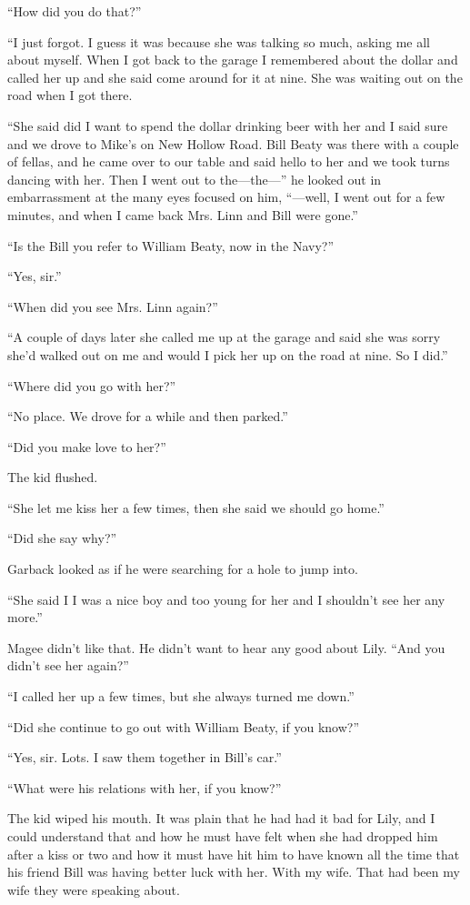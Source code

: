 \documentclass{novel}
\begin{document}
“How did you do that?”

“I just forgot. I guess it was because she was talking so much, asking me all about myself. When I got back to the garage I remembered about the dollar and called her up and she said come around for it at nine. She was waiting out on the road when I got there. 

“She said did I want to spend the dollar drinking beer with her and I said sure and we drove to Mike’s on New Hollow Road. Bill Beaty was there with a couple of fellas, and he came over to our table and said hello to her and we took turns dancing with her. Then I went out to the—the—” he looked out in embarrassment at the many eyes focused on him, “—well, I went out for a few minutes, and when I came back Mrs. Linn and Bill were gone.”

“Is the Bill you refer to William Beaty, now in the Navy?”

“Yes, sir.”

“When did you see Mrs. Linn again?”

“A couple of days later she called me up at the garage and said she was sorry she’d walked out on me and would I pick her up on the road at nine. So I did.”

“Where did you go with her?”

“No place. We drove for a while and then parked.”

“Did you make love to her?”

The kid flushed.

“She let me kiss her a few times, then she said we should go home.”

“Did she say why?”

Garback looked as if he were searching for a hole to jump into. 

“She said I I was a nice boy and too young for her and I shouldn’t see her any more.”

Magee didn’t like that. He didn’t want to hear any good about Lily. “And you didn’t see her again?”

“I called her up a few times, but she always turned me down.”

“Did she continue to go out with William Beaty, if you know?”

“Yes, sir. Lots. I saw them together in Bill’s car.”

“What were his relations with her, if you know?”

\scenestars

The kid wiped his mouth. It was plain that he had had it bad for Lily, and I could understand that and how he must have felt when she had dropped him after a kiss or two and how it must have hit him to have known all the time that his friend Bill was having better luck with her. With my wife. That had been my wife they were speaking about.
\end{document}
